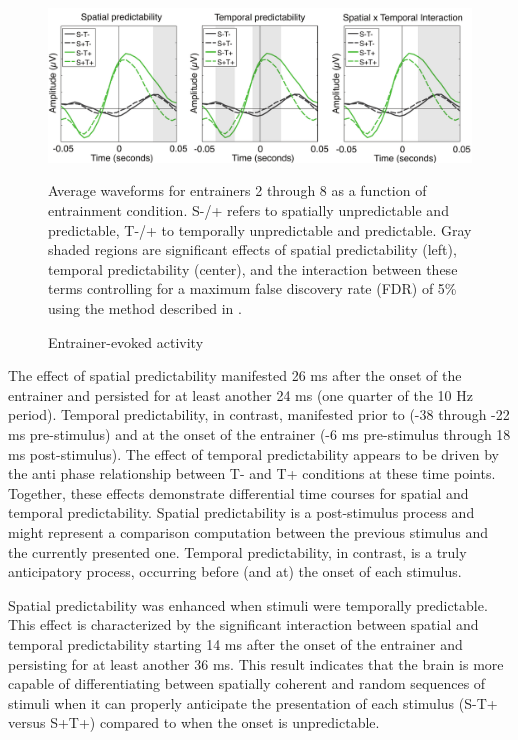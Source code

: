 \documentclass[dwyatte_dissertation.tex]{subfiles}
\begin{document}
\begin{figure}[h!]
\begin{center}
\includegraphics[width=160mm]{figs/pleast/results_entrain_tla_All_montage.pdf}
\end{center}
\caption{Entrainer-evoked activity}{Average waveforms for entrainers 2 through 8 as a function of entrainment condition. S-/+ refers to spatially unpredictable and predictable, T-/+ to temporally unpredictable and predictable. Gray shaded regions are significant effects of spatial predictability (left), temporal predictability (center), and the interaction between these terms controlling for a maximum false discovery rate (FDR) of 5\% using the method described in \protect{}.}
\label{fig:entrain_tla}
\end{figure}

The effect of spatial predictability manifested 26 ms after the onset of the entrainer and persisted for at least another 24 ms (one quarter of the 10 Hz period). Temporal predictability, in contrast, manifested prior to (-38 through -22 ms pre-stimulus) and at the onset of the entrainer (-6 ms pre-stimulus through 18 ms post-stimulus). The effect of temporal predictability appears to be driven by the anti phase relationship between T- and T+ conditions at these time points. Together, these effects demonstrate differential time courses for spatial and temporal predictability. Spatial predictability is a post-stimulus process and might represent a comparison computation between the previous stimulus and the currently presented one. Temporal predictability, in contrast, is a truly anticipatory process, occurring before (and at) the onset of each stimulus. 

Spatial predictability was enhanced when stimuli were temporally predictable. This effect is characterized by the significant interaction between spatial and temporal predictability starting 14 ms after the onset of the entrainer and persisting for at least another 36 ms. This result indicates that the brain is more capable of differentiating between spatially coherent and random sequences of stimuli when it can properly anticipate the presentation of each stimulus (S-T+ versus S+T+) compared to when the onset is unpredictable.
\end{document}
